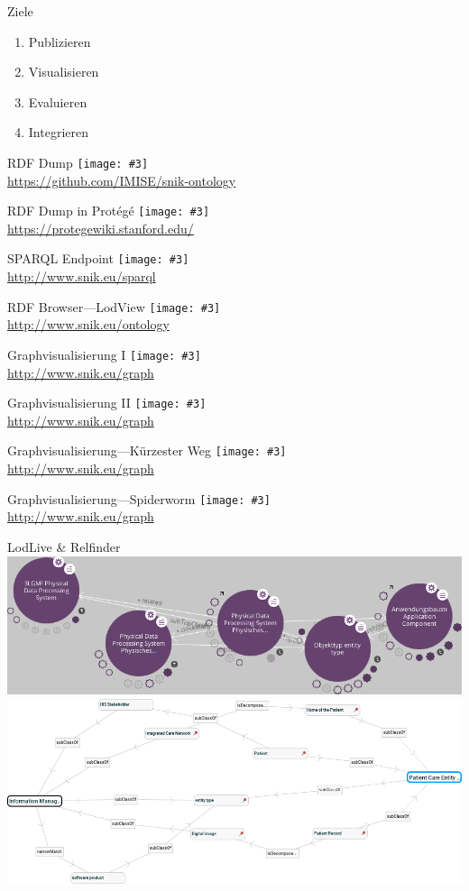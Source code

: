 \documentclass{beamer}
\newcommand{\imageslide}[4][]
{
\begin{frame}{#2}
\centering\texttt{[image: \#3]}
\\#1
\note{#4}
\end{frame}
}
\begin{document}
\begin{frame}{Ziele}
\begin{enumerate}
\item Publizieren 
\item Visualisieren 
\item Evaluieren
\item Integrieren 
\end{enumerate}
\end{frame}


\imageslide[\url{https://github.com/IMISE/snik-ontology}]{RDF Dump}{img/rdfdump.png}{}
\imageslide[\url{https://protegewiki.stanford.edu/}]{RDF Dump in Protégé}{img/protege.png}{}
\imageslide[\url{http://www.snik.eu/sparql}]{SPARQL Endpoint}{img/sparqlresult.png}{}

\imageslide[\url{http://www.snik.eu/ontology}]{RDF Browser---LodView}{img/browse-cio.png}{}

\imageslide[\url{http://www.snik.eu/graph}]{Graphvisualisierung I}{img/graph-entitytype.png}{}
\imageslide[\url{http://www.snik.eu/graph}]{Graphvisualisierung II}{img/graph-erf.png}{}
\imageslide[\url{http://www.snik.eu/graph}]{Graphvisualisierung---Kürzester Weg}{img/shortestpath.png}{}
\imageslide[\url{http://www.snik.eu/graph}]{Graphvisualisierung---Spiderworm}{img/spiderworm.png}{}

\begin{frame}{LodLive \& Relfinder}
\centering
\includegraphics[width=\textwidth]{img/lodlive.png}\\
\includegraphics[width=\textwidth]{img/relfinder.png}
\end{frame}
\end{document}
